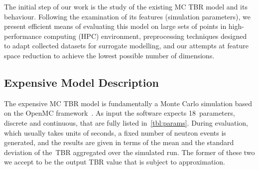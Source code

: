 The initial step of our work is the study of the existing MC TBR model and its
behaviour. Following the examination of its features (simulation parameters), we
present efficient means of evaluating this model on large sets of points in
high-performance computing (HPC) environment, preprocessing techniques designed
to adapt collected datasets for surrogate modelling, and our attempts at feature
space reduction to achieve the lowest possible number of dimensions.


\subsection{Expensive Model Description}
\label{sec:expensive-model-description}

The expensive MC TBR model is fundamentally a Monte Carlo simulation based on the
OpenMC framework~\cite{ROMANO201590}. As input the software expects 18~parameters, discrete and
continuous, that are fully listed in~\cref{tbl:params}. During evaluation, which
usually takes units of seconds, a fixed number of neutron events is generated, and the
results are given in terms of the mean and the standard deviation of the~TBR aggregated
over the simulated run. The former of these two we accept to be the output TBR
value that is subject to approximation.

